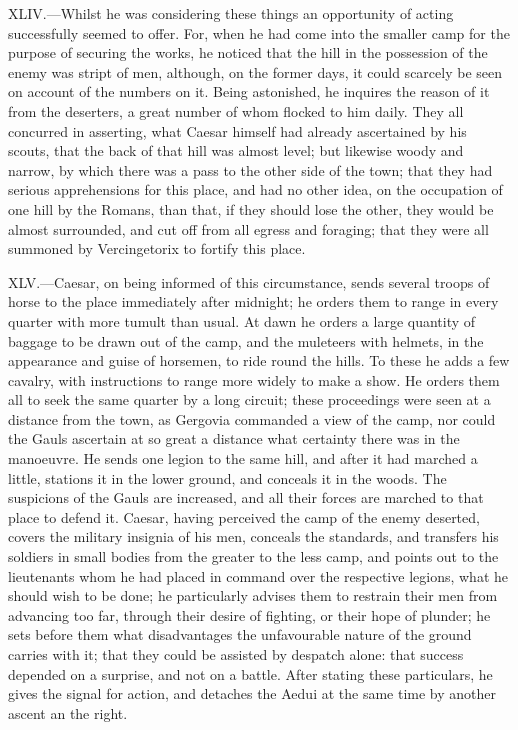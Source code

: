 XLIV.—Whilst he was considering these things an opportunity of acting
successfully seemed to offer. For, when he had come into the smaller
camp for the purpose of securing the works, he noticed that the hill in
the possession of the enemy was stript of men, although, on the former
days, it could scarcely be seen on account of the numbers on it. Being
astonished, he inquires the reason of it from the deserters, a great
number of whom flocked to him daily. They all concurred in asserting,
what Caesar himself had already ascertained by his scouts, that the back
of that hill was almost level; but likewise woody and narrow, by which
there was a pass to the other side of the town; that they had serious
apprehensions for this place, and had no other idea, on the occupation
of one hill by the Romans, than that, if they should lose the other,
they would be almost surrounded, and cut off from all egress and
foraging; that they were all summoned by Vercingetorix to fortify this
place.

XLV.—Caesar, on being informed of this circumstance, sends several
troops of horse to the place immediately after midnight; he orders them
to range in every quarter with more tumult than usual. At dawn he orders
a large quantity of baggage to be drawn out of the camp, and the
muleteers with helmets, in the appearance and guise of horsemen, to ride
round the hills. To these he adds a few cavalry, with instructions to
range more widely to make a show. He orders them all to seek the same
quarter by a long circuit; these proceedings were seen at a distance
from the town, as Gergovia commanded a view of the camp, nor could the
Gauls ascertain at so great a distance what certainty there was in the
manoeuvre. He sends one legion to the same hill, and after it had
marched a little, stations it in the lower ground, and conceals it in
the woods. The suspicions of the Gauls are increased, and all their
forces are marched to that place to defend it. Caesar, having perceived
the camp of the enemy deserted, covers the military insignia of his men,
conceals the standards, and transfers his soldiers in small bodies from
the greater to the less camp, and points out to the lieutenants whom he
had placed in command over the respective legions, what he should wish
to be done; he particularly advises them to restrain their men from
advancing too far, through their desire of fighting, or their hope of
plunder; he sets before them what disadvantages the unfavourable nature
of the ground carries with it; that they could be assisted by despatch
alone: that success depended on a surprise, and not on a battle. After
stating these particulars, he gives the signal for action, and detaches
the Aedui at the same time by another ascent an the right.

